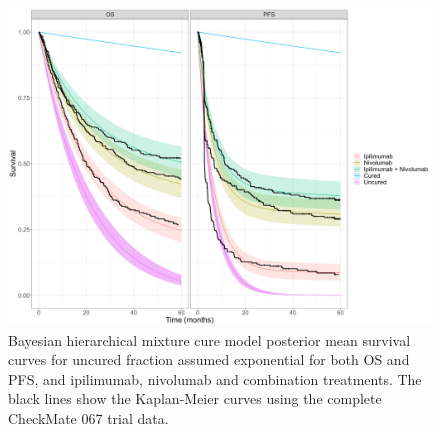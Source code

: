 \documentclass[AMA,STIX1COL]{WileyNJD-v2}
\begin{document}

\begin{figure}[!ht]
\centering
\includegraphics[width=0.7\linewidth]{bmcm_stan_exp_exp_S_plot.png}
\caption{\label{fig:S_exp^{cens}f_hier} Bayesian hierarchical mixture cure model posterior mean survival curves for uncured fraction assumed exponential for both OS and PFS, and ipilimumab, nivolumab and combination treatments. The black lines show the Kaplan-Meier curves using the complete CheckMate 067 trial data.}
\end{figure}
\end{document}
